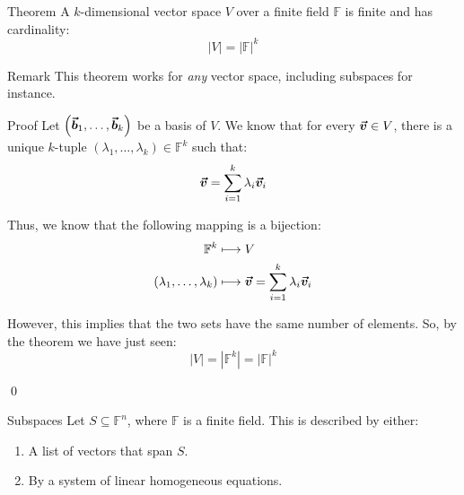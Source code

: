 \documentclass[a4paper]{article}
\begin{document}
\begin{parag}{Theorem}
    A $k$-dimensional vector space $V$ over a finite field $\mathbb{F}$ is finite and has cardinality: 
    \[\left|V\right| = \left|\mathbb{F}\right|^k\]
    
    \begin{subparag}{Remark}
        This theorem works for \textit{any} vector space, including subspaces for instance.
    \end{subparag}

    \begin{subparag}{Proof}
        Let $\left(\bvec{b}_1, \ldots, \bvec{b}_k\right)$ be a basis of $V$. We know that for every $\bm{\protect\vec{v}} \in V$, there is a unique $k$-tuple $\left(\lambda_1, \ldots, \lambda_k\right) \in \mathbb{F}^k$ such that: 
        \[\bm{\protect\vec{v}} = \sum_{i=1}^{k} \lambda_i \bm{\protect\vec{v}}_i\]
        
        Thus, we know that the following mapping is a bijection: 
        \[\begin{split}
        \mathbb{F}^k &\longmapsto V \\
        \left(\lambda_1, \ldots, \lambda_k\right) &\longmapsto \bvec{v} = \sum_{i=1}^{k} \lambda_i \bvec{v}_i
        \end{split}\]
        
        However, this implies that the two sets have the same number of elements. So, by the theorem we have just seen: 
        \[\left|V\right| = \left|\mathbb{F}^k\right| = \left|\mathbb{F}\right|^{k}\]

        \qed
    \end{subparag}
\end{parag}


\begin{parag}{Subspaces}
    Let $S \subseteq \mathbb{F}^n$, where $\mathbb{F}$ is a finite field. This is described by either:
    \begin{enumerate}
        \item A list of vectors that span $S$.
        \item By a system of linear homogeneous equations.
    \end{enumerate}
\end{parag}
\end{document}

